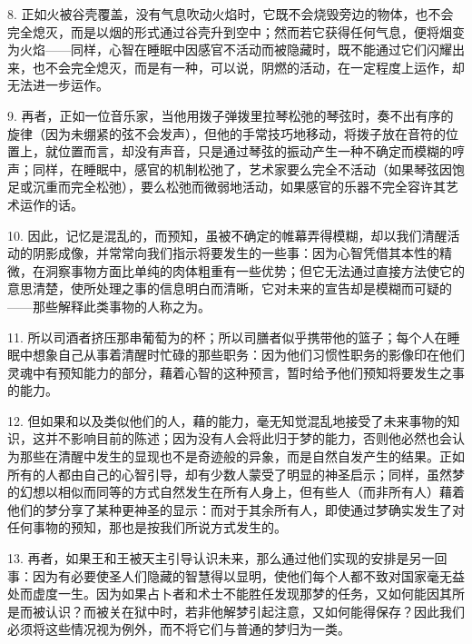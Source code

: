 8. 正如火被谷壳覆盖，没有气息吹动火焰时，它既不会烧毁旁边的物体，也不会完全熄灭，而是以烟的形式通过谷壳升到空中；然而若它获得任何气息，便将烟变为火焰——同样，心智在睡眠中因感官不活动而被隐藏时，既不能通过它们闪耀出来，也不会完全熄灭，而是有一种，可以说，阴燃的活动，在一定程度上运作，却无法进一步运作。\par

9. 再者，正如一位音乐家，当他用拨子弹拨里拉琴松弛的琴弦时，奏不出有序的旋律（因为未绷紧的弦不会发声），但他的手常技巧地移动，将拨子放在音符的位置上，就位置而言，却没有声音，只是通过琴弦的振动产生一种不确定而模糊的哼声；同样，在睡眠中，感官的机制松弛了，艺术家要么完全不活动（如果琴弦因饱足或沉重而完全松弛），要么松弛而微弱地活动，如果感官的乐器不完全容许其艺术运作的话。\par

10. 因此，记忆是混乱的，而预知，虽被不确定的帷幕弄得模糊，却以我们清醒活动的阴影成像，并常常向我们指示将要发生的一些事：因为心智凭借其本性的精微，在洞察事物方面比单纯的肉体粗重有一些优势；但它无法通过直接方法使它的意思清楚，使所处理之事的信息明白而清晰，它对未来的宣告却是模糊而可疑的——那些解释此类事物的人称之为。\par

11. 所以司酒者挤压那串葡萄为的杯；所以司膳者似乎携带他的篮子；每个人在睡眠中想象自己从事着清醒时忙碌的那些职务：因为他们习惯性职务的影像印在他们灵魂中有预知能力的部分，藉着心智的这种预言，暂时给予他们预知将要发生之事的能力。\par

12. 但如果和以及类似他们的人，藉的能力，毫无知觉混乱地接受了未来事物的知识，这并不影响目前的陈述；因为没有人会将此归于梦的能力，否则他必然也会认为那些在清醒中发生的显现也不是奇迹般的异象，而是自然自发产生的结果。正如所有的人都由自己的心智引导，却有少数人蒙受了明显的神圣启示；同样，虽然梦的幻想以相似而同等的方式自然发生在所有人身上，但有些人（而非所有人）藉着他们的梦分享了某种更神圣的显示：而对于其余所有人，即使通过梦确实发生了对任何事物的预知，那也是按我们所说方式发生的。\par

13. 再者，如果王和王被天主引导认识未来，那么通过他们实现的安排是另一回事：因为有必要使圣人们隐藏的智慧得以显明，使他们每个人都不致对国家毫无益处而虚度一生。因为如果占卜者和术士不能胜任发现那梦的任务，又如何能因其所是而被认识？而被关在狱中时，若非他解梦引起注意，又如何能得保存？因此我们必须将这些情况视为例外，而不将它们与普通的梦归为一类。\par

